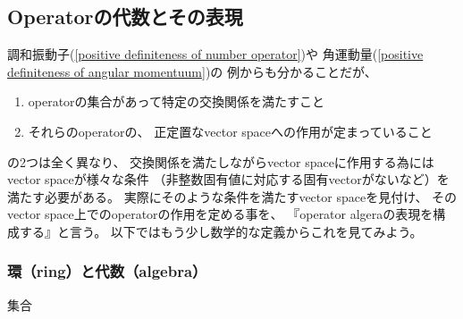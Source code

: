 \subsection{Operatorの代数とその表現}

調和振動子(\ref{positive definiteness of number operator})や
角運動量(\ref{positive definiteness of angular momentuum})の
例からも分かることだが、
\begin{enumerate}
    \item operatorの集合があって特定の交換関係を満たすこと
    \item それらのoperatorの、
        正定置なvector spaceへの作用が定まっていること
\end{enumerate}
の2つは全く異なり、
交換関係を満たしながらvector spaceに作用する為には
vector spaceが様々な条件
（非整数固有値に対応する固有vectorがないなど）を満たす必要がある。
実際にそのような条件を満たすvector spaceを見付け、
そのvector space上でのoperatorの作用を定める事を、
『operator algeraの表現を構成する』と言う。
以下ではもう少し数学的な定義からこれを見てみよう。

\subsubsection{環（ring）と代数（algebra）}

集合
